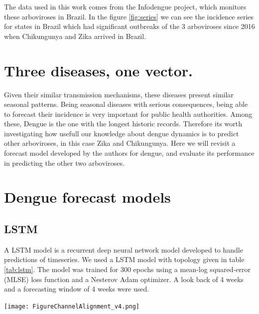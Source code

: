 \documentclass[a0,portrait]{a0poster}
\begin{document}
\begin{multicols}{3}
The data used in this work comes from the Infodengue project, which monitors 
these arboviroses in Brazil. In the figure \ref{fig:series} we can see the 
incidence series for states in Brazil which had significant outbreaks of the 3 
arboviroses since 2016 when Chikungunya and Zika arrived in Brazil.
\section*{Three diseases, one vector.}

\noindent
Given their similar transmission mechanisms, these diseases present similar 
seasonal patterns. Being seasonal diseases with serious consequences, being 
able to forecast their incidence is very important for public health 
authorities. Among these, Dengue is the one with the longest historic records. 
Therefore its worth investigating how usefull our knowledge about dengue 
dynamics is to predict other arboviroses, in this case Zika and Chikungunya. 
Here we will revisit a forecast model developed by the authors for dengue, and 
evaluate its performance in predicting the other two arboviroses.




\section*{Dengue forecast models}
\subsection*{LSTM}
\noindent
A LSTM model is a recurrent deep neural network model developed to handle 
predictions of timeseries. We used a LSTM model with topology given in table 
\ref{tab:lstm}. The model was trained for 300 epochs using a mean-log 
squared-error (MLSE) loss function  and a Nesterov Adam 
optimizer\cite{sutskever2013importance}. A look back of 4 weeks and a 
forecasting window of 4 weeks were used.

\begin{center}\vspace{1cm}
    \texttt{[image: FigureChannelAlignment\_v4.png]}
\end{center}%


\end{multicols}
\end{document}
